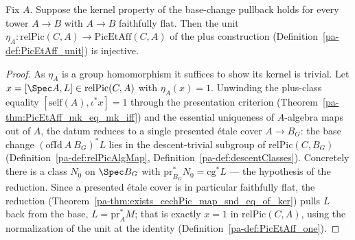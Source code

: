 \begin{theorem}
  \label{pa-thm:PicEtAff_unit_injective_of_ker}
  \leanok

  Fix \(A\).  Suppose the kernel property of the base-change pullback holds for every tower \(A
  \to B\) with \(A \to B\) faithfully flat.  Then the unit \(\eta_A \colon \mathrm{relPic}(C,A)
  \to \mathrm{PicEtAff}(C,A)\) of the plus construction (Definition~\ref{pa-def:PicEtAff_unit}) is
  injective.
\end{theorem}
\begin{proof}
  \leanok
  As \(\eta_A\) is a group homomorphism it suffices to show its kernel is trivial.  Let \(x =
  [\Spec A, L] \in \mathrm{relPic}(C,A)\) with \(\eta_A(x) = 1\).  Unwinding the plus-class
  equality \([\mathrm{self}(A), \iota^{*}x] = 1\) through the presentation criterion
  (Theorem~\ref{pa-thm:PicEtAff_mk_eq_mk_iff}) and the essential uniqueness of \(A\)-algebra maps
  out of \(A\), the datum reduces to a single presented \'etale cover \(A \to B_G\): the base
  change \((\mathrm{ofId}\ A\ B_G)^{*}L\) lies in the descent-trivial subgroup of
  \(\mathrm{relPic}(C,B_G)\) (Definition~\ref{pa-def:relPicAlgMap},
  Definition~\ref{pa-def:descentClasses}).  Concretely there is a class \(N_0\) on \(\Spec B_G\)
  with \(\mathrm{pr}_{B_G}^{*} N_0 = \mathrm{cg}^{*} L\) — the hypothesis of the reduction.  Since
  a presented \'etale cover is in particular faithfully flat, the reduction
  (Theorem~\ref{pa-thm:exists_cechPic_map_snd_eq_of_ker}) pulls \(L\) back from the base, \(L =
  \mathrm{pr}_A^{*} M\); that is exactly \(x = 1\) in \(\mathrm{relPic}(C,A)\), using the
  normalization of the unit at the identity (Definition~\ref{pa-def:PicEtAff_one}).
\end{proof}

